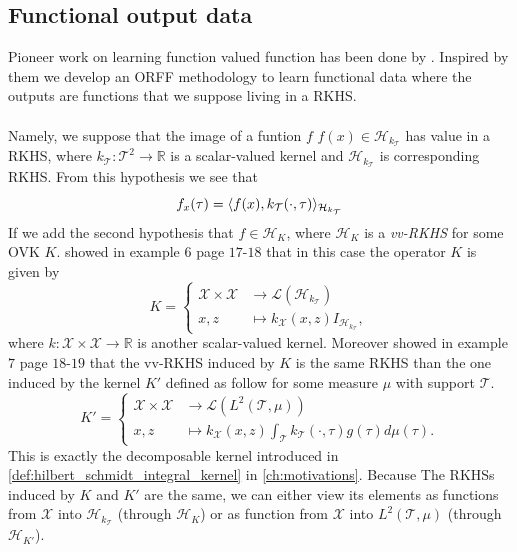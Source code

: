 \subsection{Functional output data}
Pioneer work on learning function valued function has been done by
\citet{kadri2015operator}. Inspired by them we develop an \acs{ORFF}
methodology to learn functional data where the outputs are functions that we
suppose living in a \acs{RKHS}.
\paragraph{}
Namely, we suppose that the image of a funtion $f$ $f(x) \in
\mathcal{H}_{k_{\mathcal{T}}}$ has value in a \acs{RKHS}, where
$k_{\mathcal{T}}:\mathcal{T}^2\to\mathbb{R}$ is a scalar-valued kernel and
$\mathcal{H}_{k_{\mathcal{T}}}$ is corresponding \acs{RKHS}. From this
hypothesis we see that
\begin{dmath*}
    f_x(\tau) = \inner{f(x), k_{\mathcal{T}}(\cdot,
    \tau)}_{\mathcal{H}_{k_{\mathcal{T}}}}
\end{dmath*}
If we add the second hypothesis that $f\in\mathcal{H}_K$, where $\mathcal{H}_K$
is a \emph{\acl{vv-RKHS}} for some \acl{OVK} $K$.  showed in
example $6$ page $17$-$18$ that in this case the operator $K$ is given by
\begin{dmath}
    \label{eq:functional_kernel}
    K =
    \begin{cases}
        \mathcal{X} \times \mathcal{X} & \to
        \mathcal{L}(\mathcal{H}_{k_{\mathcal{T}}}) \\
        x, z & \mapsto k_{\mathcal{X}}(x, z) I_{\mathcal{H}_{k_{\mathcal{T}}}},
    \end{cases}
\end{dmath}
where $k:\mathcal{X}\times\mathcal{X} \to \mathbb{R}$ is another scalar-valued
kernel. Moreover \citet{Carmeli2010} showed in example $7$ page $18$-$19$ that
the \acs{vv-RKHS} induced by $K$ is the same \acs{RKHS} than the one induced by
the kernel $K'$ defined as follow for some measure $\mu$ with support
$\mathcal{T}$.
\begin{dmath*}
    K' =
    \begin{cases}
        \mathcal{X} \times \mathcal{X} & \to
        \mathcal{L}\left(L^2(\mathcal{T}, \mu)\right) \\
        x, z & \mapsto k_{\mathcal{X}}(x, z)
        \int_{\mathcal{T}}k_{\mathcal{T}}(\cdot, \tau)g(\tau)d\mu(\tau).
    \end{cases}
\end{dmath*}
This is exactly the decomposable kernel introduced in
\cref{def:hilbert_schmidt_integral_kernel} in \cref{ch:motivations}. Because
The \acsp{RKHS} induced by $K$ and $K'$ are the same, we can either view its
elements as functions from $\mathcal{X}$ into $\mathcal{H}_{k_{\mathcal{T}}}$
(through $\mathcal{H}_K$) or as function from $\mathcal{X}$ into
$L^2(\mathcal{T}, \mu)$ (through $\mathcal{H}_{K'}$).


